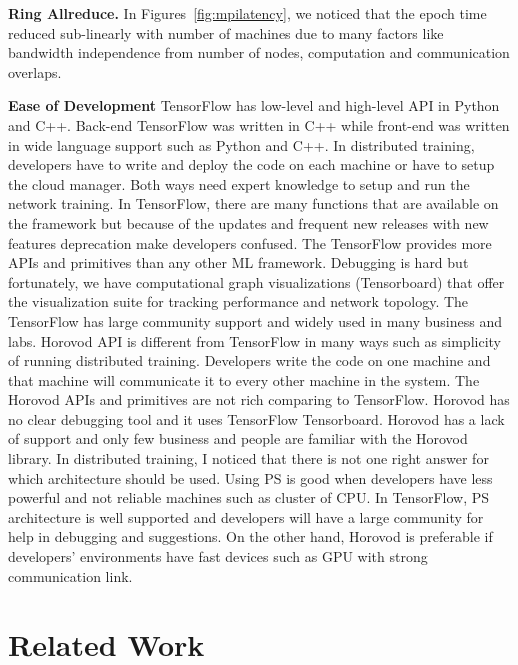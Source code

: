 \documentclass[conference]{IEEEtran}
\begin{document}

\textbf{Ring Allreduce.} In Figures~\ref{fig:mpilatency}, we noticed that the epoch time reduced sub-linearly with number of machines due to many factors like bandwidth independence from number of nodes, computation and communication overlaps. 

\textbf{Ease of Development} TensorFlow has low-level and high-level API in Python and C++. Back-end TensorFlow was written in C++ while front-end was written in wide language support such as Python and C++. In distributed training, developers have to write and deploy the code on each machine or have to setup the cloud manager. Both ways need expert knowledge to setup and run the network training. In TensorFlow, there are many functions that are available on the framework but because of the updates and frequent new releases with new features deprecation make developers confused. The TensorFlow provides more APIs and primitives than any other ML framework. Debugging is hard but fortunately, we have computational graph visualizations (Tensorboard) that offer the visualization suite for tracking performance and network topology. The TensorFlow has large community support and widely used in many business and labs. Horovod API is different from TensorFlow in many ways such as simplicity of running distributed training. Developers write the code on one machine and that machine will communicate it to every other machine in the system. The Horovod APIs and primitives are not rich comparing to TensorFlow. Horovod has no clear debugging tool and it uses TensorFlow Tensorboard. Horovod has a lack of support and only few business and people are familiar with the Horovod library. In distributed training, I noticed that there is not one right answer for which architecture should be used. Using PS is good when developers have less powerful and not reliable machines such as cluster of CPU. In TensorFlow, PS architecture is well supported and developers will have a large community for help in debugging and suggestions. On the other hand, Horovod is preferable if developers' environments have fast devices such as GPU with strong communication link. 


\section{Related Work}
\label{sec:rw}
\end{document}
